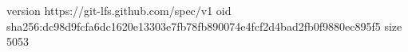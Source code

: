 version https://git-lfs.github.com/spec/v1
oid sha256:dc98d9fcfa6dc1620e13303e7fb78fb890074e4fcf2d4bad2fb0f9880ec895f5
size 5053
